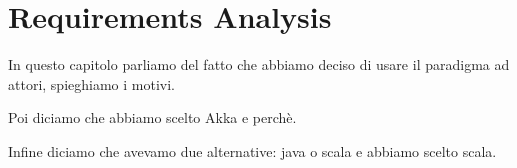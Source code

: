 \section{Requirements Analysis}

In questo capitolo parliamo del fatto che abbiamo deciso di usare il paradigma ad attori, spieghiamo i motivi.

Poi diciamo che abbiamo scelto Akka e perchè.


Infine diciamo che avevamo due alternative: java o scala e abbiamo scelto scala.
